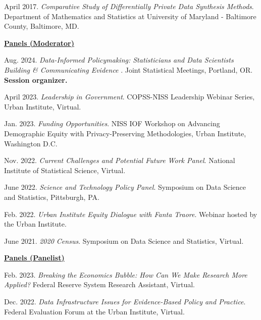 \begin{etaremune}[topsep=0pt, itemsep=4pt, partopsep=0pt, parsep=0pt]
    \item April 2017. \textit{Comparative Study of Differentially Private Data Synthesis Methods}. Department of Mathematics and Statistics at University of Maryland - Baltimore County, Baltimore, MD.
    
\vspace{6pt}
\hspace{-0.30in}\underline{\textbf{\large Panels (Moderator)}}\normalsize   
    \item Aug. 2024. \textit{Data-Informed Policymaking: Statisticians and Data Scientists Building \& Communicating Evidence }. Joint Statistical Meetings, Portland, OR. \textbf{Session organizer.}
    
    \item April 2023. \textit{Leadership in Government}. COPSS-NISS Leadership Webinar Series, Urban Institute, Virtual.
    
    \item Jan. 2023. \textit{Funding Opportunities}. NISS IOF Workshop on Advancing Demographic Equity with Privacy-Preserving Methodologies, Urban Institute, Washington D.C.
    
    \item Nov. 2022. \textit{Current Challenges and Potential Future Work Panel}. National Institute of Statistical Science, Virtual.
    
    \item June 2022. \textit{Science and Technology Policy Panel}. Symposium on Data Science and Statistics, Pittsburgh, PA.
    
    \item Feb. 2022. \textit{Urban Institute Equity Dialogue with Fanta Traore}. Webinar hosted by the Urban Institute.
    
    \item June 2021. \textit{2020 Census}. Symposium on Data Science and Statistics, Virtual.
    
    \vspace{6pt}
\hspace{-0.30in}\underline{\textbf{\large Panels (Panelist)}}\normalsize
    \item Feb. 2023. \textit{Breaking the Economics Bubble: How Can We Make Research More Applied?} Federal Reserve System Research Assistant, Virtual.
    
    \item Dec. 2022. \textit{Data Infrastructure Issues for Evidence-Based Policy and Practice}. Federal Evaluation Forum at the Urban Institute, Virtual.
    

\end{etaremune}
